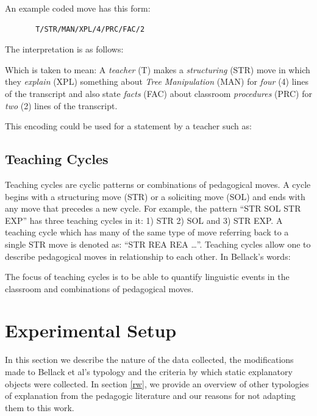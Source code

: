 \documentclass[conference]{IEEEtran}
\begin{document}
An example coded move has this form:
\begin{verbatim}
       T/STR/MAN/XPL/4/PRC/FAC/2
\end{verbatim}

The interpretation is as follows:

Which is taken to mean: A \emph{teacher} (T) makes a \emph{structuring} (STR) move
in which they \emph{explain} (XPL) something about \emph{Tree Manipulation} (MAN) for
\emph{four} (4) lines of the transcript and also state \emph{facts} (FAC) about
classroom \emph{procedures} (PRC) for \emph{two} (2) lines of the transcript.

This encoding could be used for a statement by a teacher such as:


\subsection{Teaching Cycles}
Teaching cycles are cyclic patterns or combinations of pedagogical moves. A
cycle begins with a structuring move (STR) or a soliciting move (SOL) and ends
with any move that precedes a new cycle. For example, the pattern ``STR SOL STR
EXP'' has three teaching cycles in it: 1) STR 2) SOL and 3) STR EXP. A teaching
cycle which has many of the same type of move referring back to a single STR
move is denoted as: ``STR REA REA \ldots''. Teaching cycles allow one to
describe pedagogical moves in relationship to each other. In Bellack's words:


The focus of teaching cycles is to be able to quantify linguistic events in the
classroom and combinations of pedagogical moves. 

\section{Experimental Setup}
In this section we describe the nature of the data collected, the modifications
made to Bellack et al's typology and the criteria by which static explanatory
objects were collected. In section \ref{rw}, we provide an overview of other
typologies of explanation from the pedagogic literature and our reasons for not
adapting them to this work. 
\end{document}
